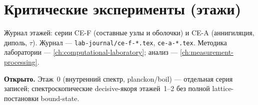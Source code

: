 \chapter{Критические эксперименты (этажи)}
\label{ch:critical-floors}

Журнал этажей: серии CE-F (составные узлы и оболочки) и CE-A (аннигиляция, диполь, $\tau$).
Журнал --- \texttt{lab-journal/ce-f-*.tex}, \texttt{ce-a-*.tex}.
Методика лаборатории --- \cref{ch:computational-laboratory}; анализ --- \cref{ch:measurement-processing}.



\medskip
\noindent\textbf{Открыто.}
Этаж~0 (внутренний спектр, planckon/boil) --- отдельная серия записей;
спектроскопические decisive-якоря этажей~1--2 без полной lattice-постановки bound-state.
